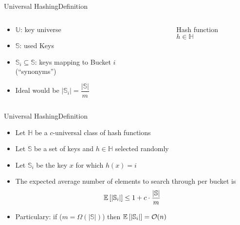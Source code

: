\begin{frame}{Universal Hashing}{Definition}
  \begin{columns}
    \begin{column}{0.5\linewidth}
      \begin{itemize}
        \item
          {\color{MainA}$\mathbb{U}$}:
          key universe
        \item
          {\color{MainA}$\mathbb{S}$}:
          used Keys
        \item
          {\color{MainA}$\mathbb{S}_i \subseteq \mathbb{S}$}:
          keys mapping to Bucket {\color{MainA}$i$} (\enquote{synonyms})
       \item
         Ideal would be
         {\color{MainA}$\vert \mathbb{S}_i \vert =\dfrac{\vert \mathbb{S} \vert}{m}$}
      \end{itemize}
    \end{column}
    \begin{column}{0.5\linewidth}
      \begin{figure}[!h]%
        \begin{adjustbox}{width=\linewidth}%
        \end{adjustbox}
        \caption{Hash function {\color{MainA}$h \in \mathbb{H}$}}%
        \label{fig:universal_hashing:hash_function_to_bucket}
      \end{figure}
    \end{column}
  \end{columns}
\end{frame}


\begin{frame}{Universal Hashing}{Definition}
  \begin{itemize}
    \item<1->
      Let {\color{MainA}$\mathbb{H}$} be a {\color{MainA}$c$}-universal class of hash functions
    \item<2->
      Let {\color{MainA}$\mathbb{S}$} be a set of keys and {\color{MainA}$h \in \mathbb{H}$} selected randomly
    \item<3->
      Let {\color{MainA}$\mathbb{S}_i$} be the key {\color{MainA}$x$} for which {\color{MainA}$h(x) = i$}
    \item<4->
      The expected average number of elements to search through per 
      bucket is {\color{MainA}\[\mathbb{E}{}\left[\vert \mathbb{S}_i \vert\right]
        \leq 1 + c \cdot \frac{\vert \mathbb{S} \vert}{m}\]}
    \item<5->
      Particulary: if  {\color{MainA}($m = \Omega(\vert \mathbb{S} \vert)$)} then
      {\color{MainA}$\mathbb{E}{}\left[\vert \mathbb{S}_i \vert\right] = \mathcal{O}(n)$}
  \end{itemize}
\end{frame}
